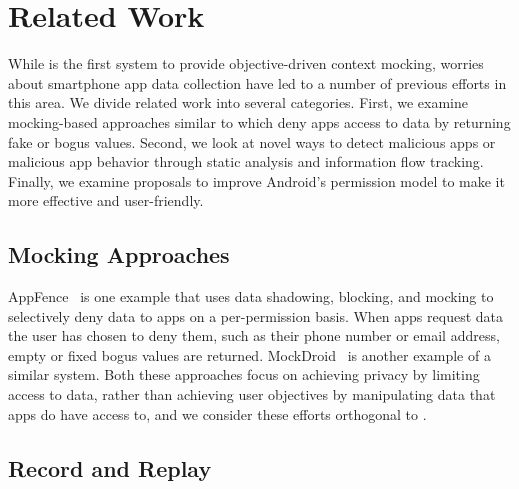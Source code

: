 \section{Related Work}
\label{sec-related}

While \PocketMocker{} is the first system to provide objective-driven context
mocking, worries about smartphone app data collection have led to a number of
previous efforts in this area. We divide related work into several
categories. First, we examine mocking-based approaches similar to
\PocketMocker{} which deny apps access to data by returning fake or bogus
values. Second, we look at novel ways to detect malicious apps or malicious
app behavior through static analysis and information flow tracking. Finally,
we examine proposals to improve Android's permission model to make it more
effective and user-friendly.



\subsection{Mocking Approaches}

AppFence~\cite{droids-ccs11} is one example that uses data shadowing,
blocking, and mocking to selectively deny data to apps on a
per-permission basis. When apps request data the user has chosen to
deny them, such as their phone number or email address, empty or fixed bogus
values are returned. MockDroid~\cite{mockdroid-hotmobile11} is another
example of a similar system. Both these approaches focus on achieving privacy
by limiting access to data, rather than achieving user objectives by
manipulating data that apps do have access to, and we consider these efforts
orthogonal to \PocketMocker{}.


\subsection{Record and Replay}

